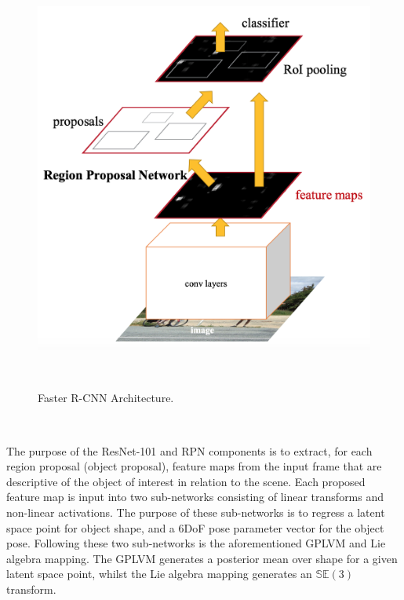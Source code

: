 \begin{figure}[!htbp]
  \centering
  \includegraphics[width=.4\linewidth]{figures/spp/rcnn.png}
  \caption[RCNN Architecture]{Faster R-CNN Architecture.\footnotemark}
~\label{figure:spp_rcnn}
\end{figure}
~

The purpose of the ResNet-101 and RPN components is to extract, for each region proposal (object proposal), 
feature maps from the input frame that are descriptive of the object of interest in relation to the scene. 
Each proposed feature map is input into two sub-networks consisting of linear transforms and non-linear activations. 
The purpose of these sub-networks is to regress a latent space point for object shape, and a 6DoF pose parameter vector 
for the object pose.  Following these two sub-networks is the aforementioned GPLVM and Lie algebra mapping. The 
GPLVM generates a posterior mean over shape for a given latent space point, whilst the 
Lie algebra mapping generates an \( \mathbb{SE}(3) \) transform. 

